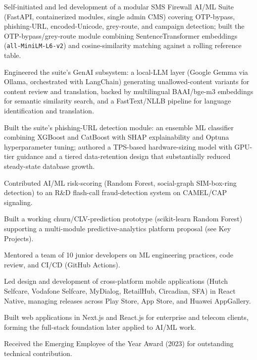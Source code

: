 \documentclass[10.5pt]{article}
\begin{document}
\begin{cvitems}
  \item Self-initiated and led development of a modular SMS Firewall AI/ML Suite (FastAPI, containerized modules, single admin CMS) covering OTP-bypass, phishing-URL, encoded-Unicode, grey-route, and campaign detection; built the OTP-bypass/grey-route module combining SentenceTransformer embeddings (\texttt{all-MiniLM-L6-v2}) and cosine-similarity matching against a rolling reference table.
  \item Engineered the suite's GenAI subsystem: a local-LLM layer (Google Gemma via Ollama, orchestrated with LangChain) generating unallowed-content variants for content review and translation, backed by multilingual BAAI/bge-m3 embeddings for semantic similarity search, and a FastText/NLLB pipeline for language identification and translation.
  \item Built the suite's phishing-URL detection module: an ensemble ML classifier combining XGBoost and CatBoost with SHAP explainability and Optuna hyperparameter tuning; authored a TPS-based hardware-sizing model with GPU-tier guidance and a tiered data-retention design that substantially reduced steady-state database growth.
  \item Contributed AI/ML risk-scoring (Random Forest, social-graph SIM-box-ring detection) to an R\&D flash-call fraud-detection system on CAMEL/CAP signaling.
  \item Built a working churn/CLV-prediction prototype (scikit-learn Random Forest) supporting a multi-module predictive-analytics platform proposal (see Key Projects).
  \item Mentored a team of 10 junior developers on ML engineering practices, code review, and CI/CD (GitHub Actions).
\end{cvitems}

\begin{cvitems}
  \item Led design and development of cross-platform mobile applications (Hutch Selfcare, Vodafone Selfcare, MyDialog, RetailHub, Circadian, SFA) in React Native, managing releases across Play Store, App Store, and Huawei AppGallery.
  \item Built web applications in Next.js and React.js for enterprise and telecom clients, forming the full-stack foundation later applied to AI/ML work.
  \item Received the Emerging Employee of the Year Award (2023) for outstanding technical contribution.
\end{cvitems}
\end{document}
